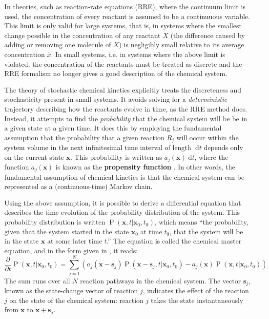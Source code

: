 \documentclass[english,letterpaper,12pt]{article}
\newcommand{\defkeywd}[1]{\textbf{#1}}
\newcommand{\dee}{\;\mathrm{d}}
\renewcommand{\vec}[1]{\ensuremath{\mathbf{#1}}}
\DeclareMathOperator{\Prob}{P}
\begin{document}
\begin{doublespacing}
In theories, such as reaction-rate equations (RRE), where the continuum limit is used, the concentration of every reactant is assumed to be a continuuous variable. This limit is only valid for large systems, that is, in systems where the smallest change possible in the concentration of any reactant $X$ (the difference caused by adding or removing one molecule of $X$) is negligibly small relative to its average concentration $\bar{x}$. In small systems, i.e. in systems where the above limit is violated, the concentration of the reactants must be treated as discrete and the RRE formalism no longer gives a good description of the chemical system.

The theory of stochastic chemical kinetics explicitly treats the discreteness and stochasticity present in small systems. It avoids solving for a \emph{deterministic} trajectory describing how the reactants evolve in time, as the RRE method does. Instead, it attempts to find the \emph{probability} that the chemical system will be be in a given state at a given time. It does this by employing the fundamental assumption that the probability that a given reaction $R_j$ will occur within the system volume in the next infinitesimal time interval of length $\dee t$ depends only on the current state $\vec{x}$. This probability is written as $a_j(\vec{x}) \dee t$, where the function $a_j(\vec{x})$ is known as the \defkeywd{propensity function} \cite{gillespie-ssa}. In other words, the fundamental assumption of chemical kinetics is that the chemical system can be represented as a (continuous-time) Markov chain.

Using the above assumption, it is possible to derive a differential equation that describes the time evolution of the probability distribution of the system. This probability distribution is written $\Prob(\vec{x}, t | \vec{x}_0, t_0)$, which means ``the probability, given that the system started in the state $\vec{x}_0$ at time $t_0$, that the system will be in the state $\vec{x}$ at some later time $t$.'' The equation is called the chemical master equation, and in the form given in \cite{gillespie-ssa}, it reads:
\begin{equation}
    \frac{\partial}{\partial t} \Prob(\vec{x}, t | \vec{x}_0, t_0) = \sum_{j=1}^N \left( a_j (\vec{x} - \vec{s}_j) \Prob(\vec{x} - \vec{s}_j, t | \vec{x}_0, t_0) - a_j(\vec{x}) \Prob(\vec{x}, t | \vec{x}_0, t_0) \right)
    \label{eq:master-eqn-gillespie}
\end{equation}
The sum runs over all $N$ reaction pathways in the chemical system. The vector $\vec{s}_j$, known as the state-change vector of reaction $j$, indicates the effect of the reaction $j$ on the state of the chemical system: reaction $j$ takes the state instantaneously from $\vec{x}$ to $\vec{x} + \vec{s}_j$.


\end{doublespacing}
\end{document}
